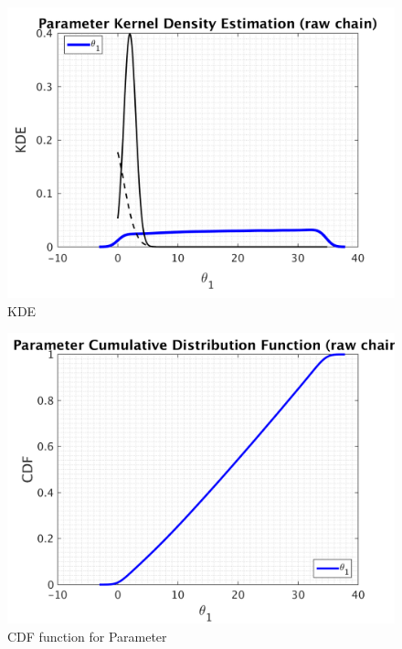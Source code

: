 \begin{figure}[h!]
  
  \centering
   \includegraphics[scale=0.75]{output_20/simple_ip_kde_raw}
   \caption{ KDE }
\end{figure}

\begin{figure}[h!]
  
  \centering
   \includegraphics[scale=0.75]{output_20/simple_ip_cdf_raw}
   \caption{CDF function for Parameter }
\end{figure}



